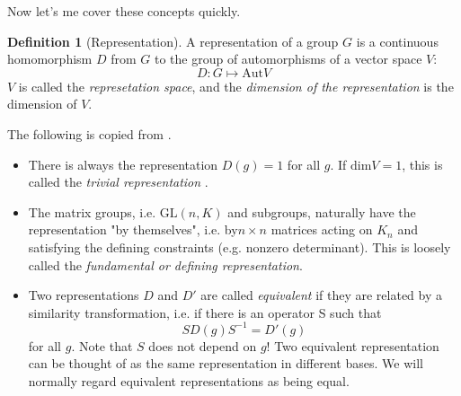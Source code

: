 \documentclass{article}
\numberwithin{equation}{subsection} %
\theoremstyle{definition}
\newtheorem{defi}{Definition}[section]
\begin{document}
Now let's me cover these concepts quickly.

\begin{defi}[Representation]
    A representation of a group $G$ is a continuous homomorphism $D$
    from $G$ to the group of automorphisms of a vector space $V$:
    \begin{equation}
        D: G\mapsto \mathrm{Aut}V
    \end{equation}
    $V$ is called the \textit{represetation space}, and the
    \textit{dimension of the representation} is the dimension of $V$.
\end{defi}

The following is copied from \cite{Ludeling}.

\begin{itemize}
    \item There is always the representation $D(g) = 1$ for all $g$.
        If $\mathrm{dim} V = 1$, this is called the \textit{trivial
        representation} .
    \item The matrix groups, i.e. $\mathrm{GL}(n, K)$ and subgroups,
        naturally have the representation "by themselves", i.e.
        by$n\times n$ matrices acting on $K_n$ and satisfying the
        defining constraints (e.g. nonzero determinant). This is
        loosely called the \textit{fundamental or defining
        representation}.
    \item Two representations $D$ and $D'$ are called
        \textit{equivalent} if they are related by a
        similarity transformation, i.e. if there is an operator S such
        that
        \begin{equation}
            SD(g)S^{-1} = D'(g)
        \end{equation}
        for all $g$. Note that $S$ does not depend on $g$! Two equivalent
        representation can be thought of as the same representation in
        different bases. We will normally regard equivalent
        representations as being equal.


\end{itemize}
\end{document}
